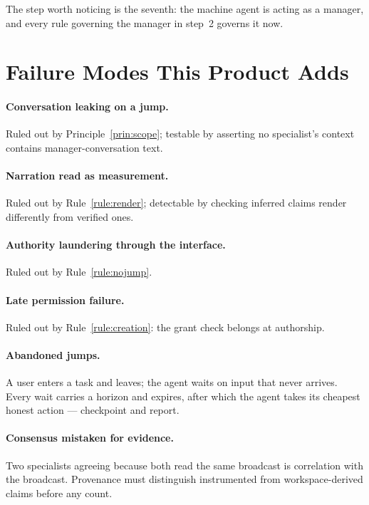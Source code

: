 \documentclass[11pt]{article}
\begin{document}
The step worth noticing is the seventh: the machine agent is acting as a manager, and every rule governing the manager in step~2 governs it now.

\section{Failure Modes This Product Adds}
\label{sec:failure}

\paragraph{Conversation leaking on a jump.} Ruled out by Principle~\ref{prin:scope}; testable by asserting no specialist's context contains manager-conversation text.

\paragraph{Narration read as measurement.} Ruled out by Rule~\ref{rule:render}; detectable by checking inferred claims render differently from verified ones.

\paragraph{Authority laundering through the interface.} Ruled out by Rule~\ref{rule:nojump}.

\paragraph{Late permission failure.} Ruled out by Rule~\ref{rule:creation}: the grant check belongs at authorship.

\paragraph{Abandoned jumps.} A user enters a task and leaves; the agent waits on input that never arrives. Every wait carries a horizon and expires, after which the agent takes its cheapest honest action --- checkpoint and report.

\paragraph{Consensus mistaken for evidence.} Two specialists agreeing because both read the same broadcast is correlation with the broadcast. Provenance must distinguish instrumented from workspace-derived claims before any count.
\end{document}
